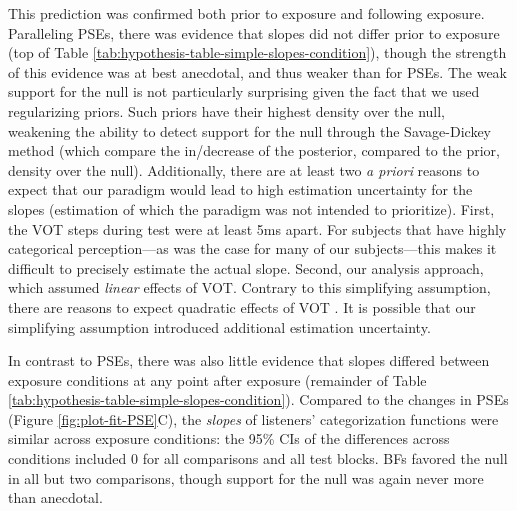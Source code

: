 \documentclass[
  11pt,
  man,mask,floatsintext]{apa6}
\begin{document}
This prediction was confirmed both prior to exposure and following exposure. Paralleling PSEs, there was evidence that slopes did not differ prior to exposure (top of Table \ref{tab:hypothesis-table-simple-slopes-condition}), though the strength of this evidence was at best anecdotal, and thus weaker than for PSEs. The weak support for the null is not particularly surprising given the fact that we used regularizing priors. Such priors have their highest density over the null, weakening the ability to detect support for the null through the Savage-Dickey method (which compare the in/decrease of the posterior, compared to the prior, density over the null). Additionally, there are at least two \emph{a priori} reasons to expect that our paradigm would lead to high estimation uncertainty for the slopes (estimation of which the paradigm was not intended to prioritize). First, the VOT steps during test were at least 5ms apart. For subjects that have highly categorical perception---as was the case for many of our subjects---this makes it difficult to precisely estimate the actual slope. Second, our analysis approach, which assumed \emph{linear} effects of VOT. Contrary to this simplifying assumption, there are reasons to expect quadratic effects of VOT \autocites[e.g.,][]{bicknell2024,bushong-jaeger2019,bushong-jaeger2024}. It is possible that our simplifying assumption introduced additional estimation uncertainty.

In contrast to PSEs, there was also little evidence that slopes differed between exposure conditions at any point after exposure (remainder of Table \ref{tab:hypothesis-table-simple-slopes-condition}). Compared to the changes in PSEs (Figure \ref{fig:plot-fit-PSE}C), the \emph{slopes} of listeners' categorization functions were similar across exposure conditions: the 95\% CIs of the differences across conditions included 0 for all comparisons and all test blocks. BFs favored the null in all but two comparisons, though support for the null was again never more than anecdotal.
\end{document}

